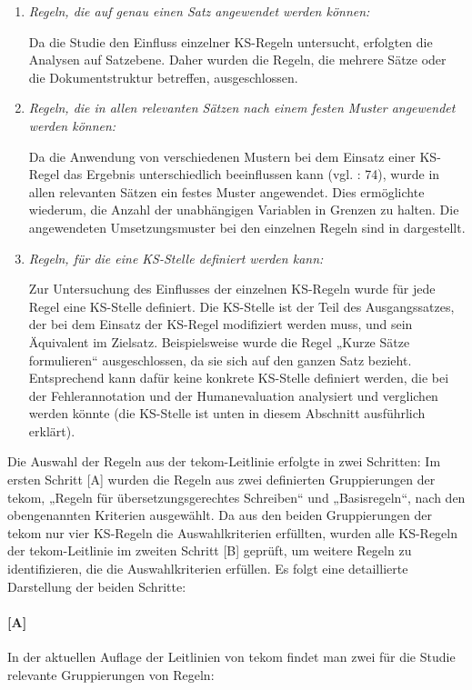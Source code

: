 \begin{enumerate}[label = {(\arabic*)}, align = left]
\item \textit{Regeln, die auf genau einen Satz angewendet werden können:}

Da die Studie den Einfluss einzelner KS-Regeln untersucht, erfolgten die Analysen auf Satzebene. Daher wurden die Regeln, die mehrere Sätze oder die Dokumentstruktur betreffen, ausgeschlossen.

\item \textit{Regeln, die in allen relevanten Sätzen nach einem festen Muster angewendet werden können:}

Da die Anwendung von verschiedenen Mustern bei dem Einsatz einer KS-Regel das Ergebnis unterschiedlich beeinflussen kann (vgl. \citealt{Roturier2006}: 74), wurde in allen relevanten Sätzen ein festes Muster angewendet. Dies ermöglichte wiederum, die Anzahl der unabhängigen Variablen in Grenzen zu halten. Die angewendeten Umsetzungsmuster bei den einzelnen Regeln sind in  dargestellt.

\item \textit{Regeln, für die eine KS-Stelle definiert werden kann:}

Zur Untersuchung des Einflusses der einzelnen KS-Regeln wurde für jede Regel eine KS-Stelle definiert. Die KS-Stelle ist der Teil des Ausgangssatzes, der bei dem Einsatz der KS-Regel modifiziert werden muss, und sein Äquivalent im Zielsatz. Beispielsweise wurde die Regel „Kurze Sätze formulieren“ ausgeschlossen, da sie sich auf den ganzen Satz bezieht. Entsprechend kann dafür keine konkrete KS-Stelle definiert werden, die bei der Fehlerannotation und der Humanevaluation analysiert und verglichen werden könnte (die KS-Stelle ist unten in diesem Abschnitt ausführlich erklärt).

\end{enumerate}

Die Auswahl der Regeln aus der tekom-Leitlinie erfolgte in zwei Schritten: Im ersten Schritt [A] wurden die Regeln aus zwei definierten Gruppierungen der tekom, „Regeln für übersetzungsgerechtes Schreiben“ und „Basisregeln“, nach den obengenannten Kriterien ausgewählt. Da aus den beiden Gruppierungen der tekom nur vier KS-Regeln die Auswahlkriterien erfüllten, wurden alle KS-Regeln der tekom-Leitlinie im zweiten Schritt [B] geprüft, um weitere Regeln zu identifizieren, die die Auswahlkriterien erfüllen. Es folgt eine detaillierte Darstellung der beiden Schritte:


\paragraph*{[A]} In der aktuellen Auflage der Leitlinien von tekom findet man zwei für die Studie relevante Gruppierungen von Regeln:

